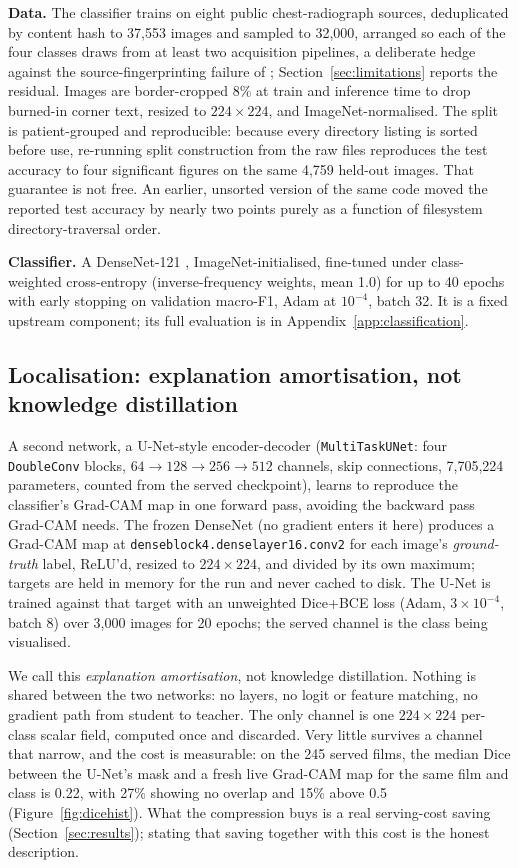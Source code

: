 \documentclass{article}
\begin{document}
\textbf{Data.} The classifier trains on eight public chest-radiograph sources, deduplicated by content hash to 37{,}553 images and sampled to 32{,}000, arranged so each of the four classes draws from at least two acquisition pipelines, a deliberate hedge against the source-fingerprinting failure of \citet{zech2018variable}; Section~\ref{sec:limitations} reports the residual. Images are border-cropped 8\% at train and inference time to drop burned-in corner text, resized to $224\times224$, and ImageNet-normalised. The split is patient-grouped and reproducible: because every directory listing is sorted before use, re-running split construction from the raw files reproduces the test accuracy to four significant figures on the same 4{,}759 held-out images. That guarantee is not free. An earlier, unsorted version of the same code moved the reported test accuracy by nearly two points purely as a function of filesystem directory-traversal order.

\textbf{Classifier.} A DenseNet-121 \citep{huang2017densenet}, ImageNet-initialised, fine-tuned under class-weighted cross-entropy (inverse-frequency weights, mean 1.0) for up to 40 epochs with early stopping on validation macro-F1, Adam at $10^{-4}$, batch 32. It is a fixed upstream component; its full evaluation is in Appendix~\ref{app:classification}.

\subsection{Localisation: explanation amortisation, not knowledge distillation}
\label{sec:distillation}
A second network, a U-Net-style encoder-decoder (\texttt{MultiTaskUNet}: four \texttt{DoubleConv} blocks, $64\to128\to256\to512$ channels, skip connections, 7{,}705{,}224 parameters, counted from the served checkpoint), learns to reproduce the classifier's Grad-CAM map in one forward pass, avoiding the backward pass Grad-CAM needs. The frozen DenseNet (no gradient enters it here) produces a Grad-CAM map at \texttt{denseblock4.denselayer16.conv2} for each image's \emph{ground-truth} label, ReLU'd, resized to $224\times224$, and divided by its own maximum; targets are held in memory for the run and never cached to disk. The U-Net is trained against that target with an unweighted Dice+BCE loss (Adam, $3\times10^{-4}$, batch 8) over 3{,}000 images for 20 epochs; the served channel is the class being visualised.

We call this \emph{explanation amortisation}, not knowledge distillation. Nothing is shared between the two networks: no layers, no logit or feature matching, no gradient path from student to teacher. The only channel is one $224\times224$ per-class scalar field, computed once and discarded. Very little survives a channel that narrow, and the cost is measurable: on the 245 served films, the median Dice between the U-Net's mask and a fresh live Grad-CAM map for the same film and class is 0.22, with 27\% showing no overlap and 15\% above 0.5 (Figure~\ref{fig:dicehist}). What the compression buys is a real serving-cost saving (Section~\ref{sec:results}); stating that saving together with this cost is the honest description.
\end{document}
